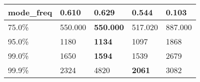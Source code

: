 \begin{table}[H]
\begin{tabular}{|l|m{10em}|m{10em}|m{10em}|m{10em}|}
\hline mode\_freq & 0.610 & \bfseries 0.629 & 0.544 & \cellcolor[rgb]{0.9, 0.54, 0.52} 0.103 \\
\hline 75.0\% & 550.000 & \bfseries 550.000 & 517.020 & \cellcolor[rgb]{0.9, 0.54, 0.52} 887.000 \\
\hline 95.0\% & 1180 & \bfseries 1134 & 1097 & \cellcolor[rgb]{0.9, 0.54, 0.52} 1868 \\
\hline 99.0\% & 1650 & \bfseries 1594 & 1539 & \cellcolor[rgb]{0.9, 0.54, 0.52} 2679 \\
\hline 99.9\% & 2324 & \cellcolor[rgb]{0.9, 0.54, 0.52} 4820 & \bfseries 2061 & 3082 \\
\hline
\end{tabular}
\end{table}
